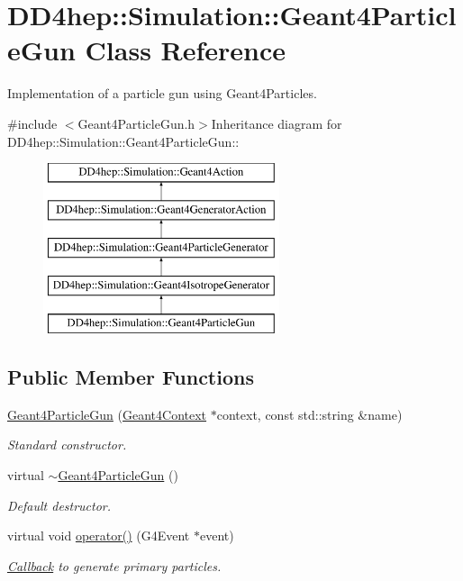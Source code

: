 \hypertarget{class_d_d4hep_1_1_simulation_1_1_geant4_particle_gun}{
\section{DD4hep::Simulation::Geant4ParticleGun Class Reference}
\label{class_d_d4hep_1_1_simulation_1_1_geant4_particle_gun}
}


Implementation of a particle gun using Geant4Particles.  


{\ttfamily \#include $<$Geant4ParticleGun.h$>$}Inheritance diagram for DD4hep::Simulation::Geant4ParticleGun::\begin{figure}[H]
\begin{center}
\leavevmode
\includegraphics[height=5cm]{class_d_d4hep_1_1_simulation_1_1_geant4_particle_gun}
\end{center}
\end{figure}
\subsection*{Public Member Functions}
\begin{DoxyCompactItemize}
\item 
\hyperlink{class_d_d4hep_1_1_simulation_1_1_geant4_particle_gun_a294f495235fd5fa6f6a949f0657f0e0e}{Geant4ParticleGun} (\hyperlink{class_d_d4hep_1_1_simulation_1_1_geant4_context}{Geant4Context} $\ast$context, const std::string \&name)
\begin{DoxyCompactList}\small\item\em Standard constructor. \item\end{DoxyCompactList}\item 
virtual \hyperlink{class_d_d4hep_1_1_simulation_1_1_geant4_particle_gun_a96f52fd8078d74c591d410facb13fe21}{$\sim$Geant4ParticleGun} ()
\begin{DoxyCompactList}\small\item\em Default destructor. \item\end{DoxyCompactList}\item 
virtual void \hyperlink{class_d_d4hep_1_1_simulation_1_1_geant4_particle_gun_a4e68905424d21f2386d24d3cbaf795f1}{operator()} (G4Event $\ast$event)
\begin{DoxyCompactList}\small\item\em \hyperlink{class_d_d4hep_1_1_callback}{Callback} to generate primary particles. \item\end{DoxyCompactList}\end{DoxyCompactItemize}
